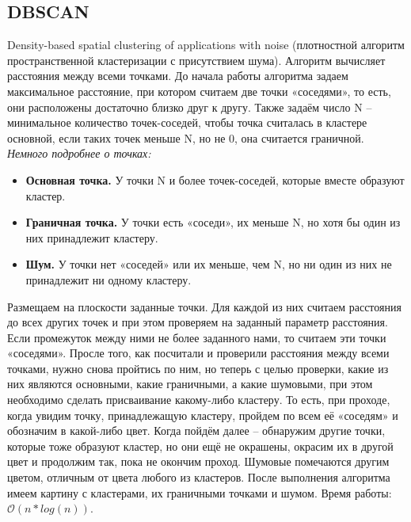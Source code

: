 \documentclass[12pt, a4paper]{article}
\begin{document}
\subsection{DBSCAN}Density-based spatial clustering of applications with noise (плотностной алгоритм пространственной кластеризации с присутствием шума). Алгоритм вычисляет расстояния между всеми точками. До начала работы алгоритма задаем максимальное расстояние, при котором считаем две точки «соседями», то есть, они расположены достаточно близко друг к другу. Также задаём число N -- минимальное количество точек-соседей, чтобы точка считалась в кластере основной, если таких точек меньше N, но не 0, она считается граничной. \\\textit{Немного подробнее о точках:}
\begin{itemize}
\item\textbf{Основная точка.} У точки N и более точек-соседей, которые вместе образуют кластер.
\item\textbf{Граничная точка.} У точки есть «соседи», их меньше N, но хотя бы один из них принадлежит кластеру.
\item\textbf{Шум.} У точки нет «соседей» или их меньше, чем N, но ни один из них не принадлежит ни одному кластеру.
\end{itemize}
Размещаем на плоскости заданные точки. Для каждой из них считаем расстояния до всех других точек и при этом проверяем на заданный параметр расстояния. Если промежуток между ними не более заданного нами, то считаем эти точки «соседями». Просле того, как посчитали и проверили расстояния между всеми точками, нужно снова пройтись по ним, но теперь с целью проверки, какие из них являются основными, какие граничными, а какие шумовыми, при этом необходимо сделать присваивание какому-либо кластеру. То есть, при проходе, когда увидим точку, принадлежащую кластеру, пройдем по всем её «соседям» и обозначим в какой-либо цвет. Когда пойдём далее -- обнаружим другие точки, которые тоже образуют кластер, но они ещё не окрашены, окрасим их в другой цвет и продолжим так, пока не окончим проход. Шумовые помечаются другим цветом, отличным от цвета любого из кластеров. После выполнения алгоритма имеем картину с кластерами, их граничными точками и шумом. Время работы: $\mathcal{O}(n*log(n)).$
\end{document}

